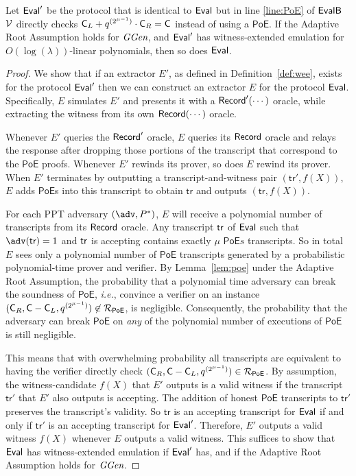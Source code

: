 \begin{lemma} \label{lemma:poe_security}
Let $\textsf{{Eval}}'$ be the protocol that is identical to $\textsf{{Eval}}$ but in line \ref{line:PoE} of $\textsf{{EvalB}}$ $\mathcal{V}$ directly checks $\gr{C}_L+ q^{(2^{\mu-1})} \cdot \gr{C}_R=\gr{C}$ instead of using a $\textsf{PoE}$. If the Adaptive Root Assumption holds for $\textit{GGen}$, and $\textsf{{Eval}}'$ has witness-extended emulation for $O(\log(\lambda))$-linear polynomials, then so does $\textsf{{Eval}}$.
\end{lemma}

\begin{proof}
We show that if an extractor $E'$, as defined in Definition~\ref{def:wee}, exists for the protocol $\textsf{{Eval}}'$ then we can construct an extractor $E$ for the protocol $\textsf{{Eval}}$. Specifically, $E$ simulates $E'$ and presents it with a $\textsf{{Record}}'(\cdots)$ oracle, while extracting the witness from its own $\textsf{{Record}}(\cdots)$ oracle.

Whenever $E'$ queries the $\textsf{{Record}}'$ oracle, $E$ queries its $\textsf{{Record}}$ oracle and relays the response after dropping those portions of the transcript that correspond to the $\mathsf{PoE}$ proofs. Whenever $E'$ rewinds its prover, so does $E$ rewind its prover. When $E'$ terminates by outputting a transcript-and-witness pair $(\mathsf{tr}', f(X))$, $E$ adds $\mathsf{PoE}$s into this transcript to obtain $\mathsf{tr}$ and outputs $(\mathsf{tr}, f(X))$.

For each PPT adversary $(\adv,P^*)$, $E$ will receive a polynomial number of transcripts from its $\textsf{{Record}}$ oracle. Any transcript $\textsf{{tr}}$ of $\textsf{{Eval}}$ such that $\adv(\tr)=1$ and $\textsf{{tr}}$ is accepting contains exactly $\mu$ $\textsf{PoE}s$ transcripts. 
So in total $E$ sees only a polynomial number of $\textsf{PoE}$ transcripts generated by a probabilistic polynomial-time prover and verifier. By Lemma~\ref{lem:poe} under the Adaptive Root Assumption, the probability that a polynomial time adversary can break the soundness of $\textsf{PoE}$, \emph{i.e.}, convince a verifier on an instance $(\gr{C}_R,\gr{C}-\gr{C}_{L},q^{(2^{\mu-1})})\not\in\mathcal{R}_{\textsf{PoE}}$, is negligible. 
Consequently, the probability that the adversary can break $\textsf{PoE}$ on \emph{any} of the polynomial number of executions of $\mathsf{PoE}$ is still negligible.

This means that with overwhelming probability all transcripts are equivalent to having the verifier directly check $(\gr{C}_R,\gr{C}-\gr{C}_{L},q^{(2^{\mu-1})})\in\mathcal{R}_{\textsf{PoE}}$. By assumption, the witness-candidate $f(X)$ that $E'$ outputs is a valid witness if the transcript $\mathsf{tr}'$ that $E'$ also outputs is accepting. The addition of honest $\mathsf{PoE}$ transcripts to $\mathsf{tr}'$ preserves the transcript's validity. So $\mathsf{tr}$ is an accepting transcript for $\textsf{{Eval}}$ if and only if $\mathsf{tr}'$ is an accepting transcript for $\textsf{{Eval}}'$. Therefore, $E'$ outputs a valid witness $f(X)$ whenever $E$ outputs a valid witness. This suffices to show that $\textsf{{Eval}}$ has witness-extended emulation if $\textsf{{Eval}}'$ has, and if the Adaptive Root Assumption holds for $\textit{GGen}$.
\end{proof}



